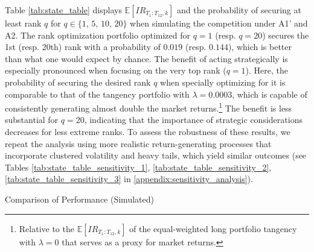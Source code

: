 \documentclass[3p,times,twocolumn]{elsarticle}
\begin{document}
Table \ref{tab:state_table} displays $\mathbb{E}[IR_{T_{1}:T_{12},k}]$ and the probability of securing at least rank $q$ for $q \in \{1,\,5,\,10,\,20\}$ when simulating the competition under A1' and A2.
The rank optimization portfolio optimized for $q=1$ (resp. $q=20$) secures the 1st (resp. 20th) rank with a probability of $0.019$ (resp. $0.144$), which is better than what one would expect by chance.
The benefit of acting strategically is especially pronounced when focusing on the very top rank ($q=1$).
Here, the probability of securing the desired rank $q$ when specially optimizing for it is comparable to that of the tangency portfolio with $\lambda=0.0003$, which is capable of consistently generating almost double the market returns.\footnote{
    Relative to the $\mathbb{E}[IR_{T_{1}:T_{12},k}]$ of the equal-weighted long portfolio tangency with $\lambda = 0$ that serves as a proxy for market returns.
}
The benefit is less substantial for $q=20$, indicating that the importance of strategic considerations decreases for less extreme ranks.
To assess the robustness of these results, we repeat the analysis using more realistic return-generating processes that incorporate clustered volatility and heavy tails, which yield similar outcomes (see Tables \ref{tab:state_table_sensitivity_1}, \ref{tab:state_table_sensitivity_2}, \ref{tab:state_table_sensitivity_3} in \ref{appendix:sensitivity_analysis}).

\begin{table}[!htbp]
    \fontsize{5}{5}\selectfont
    \centering
    \caption{Comparison of Performance (Simulated)}
    \label{tab:state_table}
\end{table}
\end{document}
